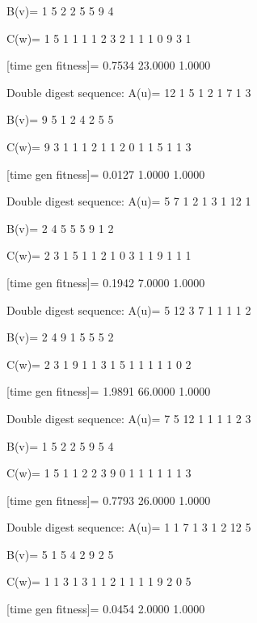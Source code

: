 B(v)=
     1     5     2     2     5     5     9     4

C(w)=
     1     5     1     1     1     1     2     3     2     1     1     1     0     9     3     1

[time gen fitness]=
    0.7534   23.0000    1.0000

Double digest sequence:
A(u)=
    12     1     5     1     2     1     7     1     3

B(v)=
     9     5     1     2     4     2     5     5

C(w)=
     9     3     1     1     1     2     1     1     2     0     1     1     5     1     1     3

[time gen fitness]=
    0.0127    1.0000    1.0000

Double digest sequence:
A(u)=
     5     7     1     2     1     3     1    12     1

B(v)=
     2     4     5     5     5     9     1     2

C(w)=
     2     3     1     5     1     1     2     1     0     3     1     1     9     1     1     1

[time gen fitness]=
    0.1942    7.0000    1.0000

Double digest sequence:
A(u)=
     5    12     3     7     1     1     1     1     2

B(v)=
     2     4     9     1     5     5     5     2

C(w)=
     2     3     1     9     1     1     3     1     5     1     1     1     1     1     0     2

[time gen fitness]=
    1.9891   66.0000    1.0000

Double digest sequence:
A(u)=
     7     5    12     1     1     1     1     2     3

B(v)=
     1     5     2     2     5     9     5     4

C(w)=
     1     5     1     1     2     2     3     9     0     1     1     1     1     1     1     3

[time gen fitness]=
    0.7793   26.0000    1.0000

Double digest sequence:
A(u)=
     1     1     7     1     3     1     2    12     5

B(v)=
     5     1     5     4     2     9     2     5

C(w)=
     1     1     3     1     3     1     1     2     1     1     1     1     9     2     0     5

[time gen fitness]=
    0.0454    2.0000    1.0000

